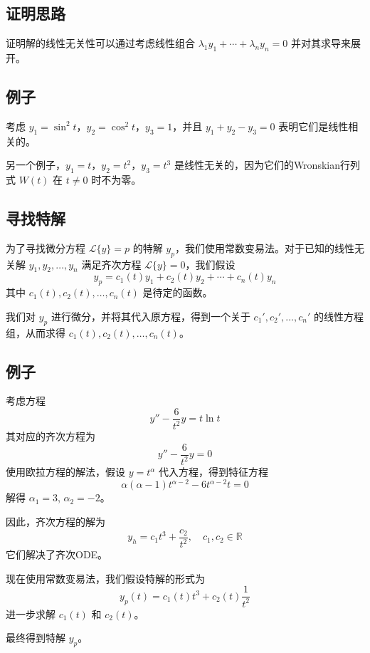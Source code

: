 \documentclass{ctexart}
\begin{document}
\subsection*{证明思路}
证明解的线性无关性可以通过考虑线性组合 \( \lambda_1 y_1 + \cdots + \lambda_n y_n = 0 \) 并对其求导来展开。

\subsection*{例子}
考虑 \( y_1 = \sin^2 t \)，\( y_2 = \cos^2 t \)，\( y_3 = 1 \)，并且 \( y_1 + y_2 - y_3 = 0 \) 表明它们是线性相关的。

另一个例子，\( y_1 = t \)，\( y_2 = t^2 \)，\( y_3 = t^3 \) 是线性无关的，因为它们的Wronskian行列式 \( W(t) \) 在 \( t \neq 0 \) 时不为零。



\subsection*{寻找特解}
为了寻找微分方程 \( \mathcal{L}\{y\} = p \) 的特解 \( y_p \)，我们使用常数变易法。对于已知的线性无关解 \( y_1, y_2, \ldots, y_n \) 满足齐次方程 \( \mathcal{L}\{y\} = 0 \)，我们假设
\[
y_p = c_1(t)y_1 + c_2(t)y_2 + \cdots + c_n(t)y_n
\]
其中 \( c_1(t), c_2(t), \ldots, c_n(t) \) 是待定的函数。

我们对 \( y_p \) 进行微分，并将其代入原方程，得到一个关于 \( c_1', c_2', \ldots, c_n' \) 的线性方程组，从而求得 \( c_1(t), c_2(t), \ldots, c_n(t) \)。

\subsection*{例子}
考虑方程
\[
y'' - \frac{6}{t^2}y = t \ln t
\]
其对应的齐次方程为
\[
y'' - \frac{6}{t^2}y = 0
\]
使用欧拉方程的解法，假设 \( y = t^\alpha \) 代入方程，得到特征方程
\[
\alpha(\alpha-1)t^{\alpha-2} - 6t^{\alpha-2}t = 0
\]
解得 \( \alpha_1 = 3 \), \( \alpha_2 = -2 \)。

因此，齐次方程的解为
\[
y_h = c_1t^3 + \frac{c_2}{t^2}, \quad c_1, c_2 \in \mathbb{R}
\]
它们解决了齐次ODE。

现在使用常数变易法，我们假设特解的形式为
\[
y_p(t) = c_1(t)t^3 + c_2(t)\frac{1}{t^2}
\]
进一步求解 \( c_1(t) \) 和 \( c_2(t) \)。


最终得到特解 \( y_p \)。
\end{document}
